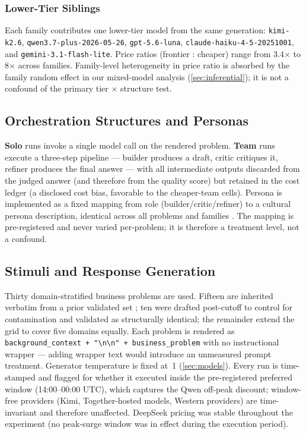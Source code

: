 \documentclass[12pt,a4paper]{article}
\begin{document}
\subsubsection{Lower-Tier Siblings}

Each family contributes one lower-tier model from the same generation:
\texttt{kimi-k2.6}, \texttt{qwen3.7-plus-2026-05-26}, \texttt{gpt-5.6-luna},
\texttt{claude-haiku-4-5-20251001}, and \texttt{gemini-3.1-flash-lite}. Price
ratios (frontier : cheaper) range from 3.4$\times$ to 8$\times$ across families.
Family-level heterogeneity in price ratio is absorbed by the family random
effect in our mixed-model analysis (\cref{sec:inferential}); it is not a
confound of the primary tier $\times$ structure test.

\subsection{Orchestration Structures and Personas}

\textbf{Solo} runs invoke a single model call on the rendered problem.
\textbf{Team} runs execute a three-step pipeline --- builder produces a draft,
critic critiques it, refiner produces the final answer --- with all intermediate
outputs discarded from the judged answer (and therefore from the quality score)
but retained in the cost ledger (a disclosed cost bias, favorable to the
cheaper-team cells). Persona is implemented as a fixed mapping from role
(builder/critic/refiner) to a cultural persona description, identical across all
problems and families \citep{Hariri2026b}. The mapping is pre-registered and
never varied per-problem; it is therefore a treatment level, not a confound.

\subsection{Stimuli and Response Generation}

Thirty domain-stratified business problems are used. Fifteen are inherited
verbatim from a prior validated set \citep{Hariri2025a}; ten were drafted
post-cutoff to control for contamination and validated as structurally identical;
the remainder extend the grid to cover five domains equally. Each problem is
rendered as \texttt{background\_context + "\textbackslash n\textbackslash n" +
business\_problem} with no instructional wrapper --- adding wrapper text would
introduce an unmeasured prompt treatment. Generator temperature is fixed at~1
(\cref{sec:models}). Every run is time-stamped and flagged for whether it
executed inside the pre-registered preferred window (14:00--00:00 UTC), which
captures the Qwen off-peak discount; window-free providers (Kimi, Together-hosted
models, Western providers) are time-invariant and therefore unaffected.
DeepSeek pricing was stable throughout the experiment (no peak-surge window was
in effect during the execution period).
\end{document}
